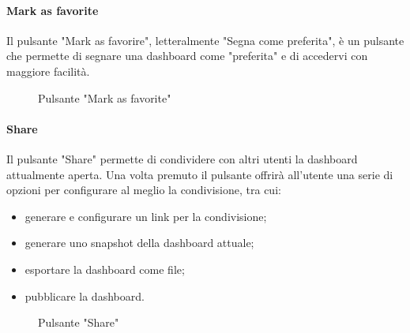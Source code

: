 \paragraph{Mark as favorite}
Il pulsante "Mark as favorire", letteralmente "Segna come preferita", è un pulsante che permette di segnare una dashboard come "preferita" e di accedervi con maggiore facilità.
\begin{figure}[H]
    \centering
    \caption{Pulsante "Mark as favorite"}
    \label{fig:my_label}
\end{figure}

\paragraph{Share}
Il pulsante "Share" permette di condividere con altri utenti la dashboard attualmente aperta. Una volta premuto il pulsante offrirà all'utente una serie di opzioni per configurare al meglio la condivisione, tra cui:
\begin{itemize}
    \item generare e configurare un link per la condivisione;
    \item generare uno snapshot della dashboard attuale;
    \item esportare la dashboard come file;
    \item pubblicare la dashboard.
\end{itemize}
\begin{figure}[H]
    \centering
    \caption{Pulsante "Share"}
    \label{fig:my_label}
\end{figure}

